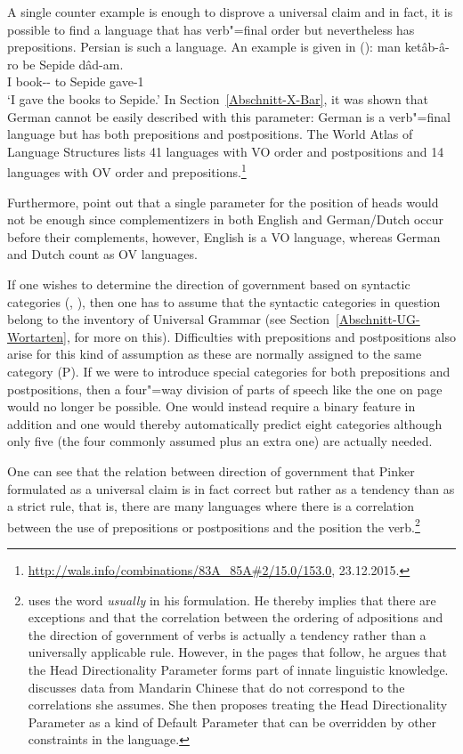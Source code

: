 A single counter example is enough to disprove a universal  claim and in fact, it is possible to
find a language that has verb"=final order but nevertheless has prepositions.
Persian is such a language. An example is given in ():
\ea
\gll man ketâb-â-ro be Sepide dâd-am.\\
     I book-\pl-\RA{} to Sepide gave-1\sg\\
\glt `I gave the books to Sepide.'
\z
In Section~\ref{Abschnitt-X-Bar}, it was shown that German cannot be easily described with this parameter: German is a verb"=final language but has both
prepositions and postpositions. The World Atlas of Language Structures lists 41 languages with VO
order and postpositions and 14 languages with OV order and prepositions.\footnote{
  \url{http://wals.info/combinations/83A_85A\#2/15.0/153.0}, 23.12.2015.
}

Furthermore, \citet[]{GW94a} point out that a single parameter for the position of heads would not be enough since complementizers in both English and German/Dutch
occur before their complements, however, English is a VO language, whereas German and Dutch count as OV languages.

If one wishes to determine the direction of government based on syntactic categories (\citealp[]{GW94a}, \citealp[]{Chomsky2005a}), then one has to assume
that the syntactic categories in question belong to the inventory of Universal Grammar (see Section~\ref{Abschnitt-UG-Wortarten}, for more on this).
Difficulties with prepositions and postpositions also arise for this kind of assumption as these are normally assigned to the same category (P).
If we were to introduce special categories for both prepositions and postpositions, then a four"=way
division of parts of speech like the one on page~\pageref{Tabelle-Merkmalszerlegung-Wortarten} would
no longer be possible. One would instead require a binary feature in addition and one would thereby
automatically predict eight categories although only five (the four commonly assumed plus an extra one) are actually needed.

One can see that the relation between direction of government that Pinker formulated as a universal
claim is in fact correct but rather as a tendency than as a strict rule, that is, there are many languages where
there is a correlation between the use of prepositions or postpositions and the position the verb.\footnote{
\citet[]{Pinker94a} uses the word \emph{usually} in his formulation. He thereby implies
that there are exceptions and that the correlation between the ordering of adpositions and the
direction of government of verbs is actually a tendency rather than
a universally applicable rule. However, in the pages that follow, he argues that the Head Directionality Parameter forms part of innate linguistic knowledge.
\citet[]{Travis84a-u} discusses data from Mandarin Chinese that do not correspond to the correlations she assumes. She then proposes treating the Head Directionality Parameter
as a kind of Default Parameter that can be overridden by other constraints in the language.
} 

